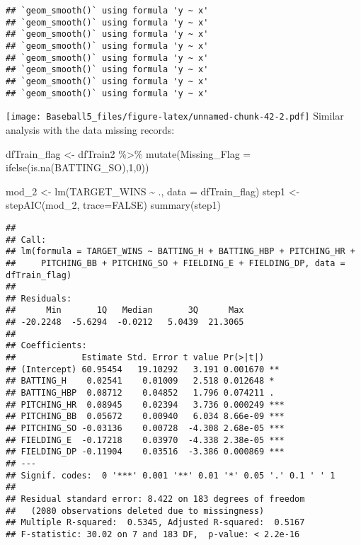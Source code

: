 \documentclass[
]{article}
\newenvironment{Shaded}{\begin{snugshade}}{\end{snugshade}}
\newcommand{\AttributeTok}[1]{\textcolor[rgb]{0.77,0.63,0.00}{#1}}
\newcommand{\ConstantTok}[1]{\textcolor[rgb]{0.00,0.00,0.00}{#1}}
\newcommand{\DecValTok}[1]{\textcolor[rgb]{0.00,0.00,0.81}{#1}}
\newcommand{\FunctionTok}[1]{\textcolor[rgb]{0.00,0.00,0.00}{#1}}
\newcommand{\NormalTok}[1]{#1}
\newcommand{\OtherTok}[1]{\textcolor[rgb]{0.56,0.35,0.01}{#1}}
\newcommand{\SpecialCharTok}[1]{\textcolor[rgb]{0.00,0.00,0.00}{#1}}
\begin{document}
\begin{verbatim}
## `geom_smooth()` using formula 'y ~ x'
## `geom_smooth()` using formula 'y ~ x'
## `geom_smooth()` using formula 'y ~ x'
## `geom_smooth()` using formula 'y ~ x'
## `geom_smooth()` using formula 'y ~ x'
## `geom_smooth()` using formula 'y ~ x'
## `geom_smooth()` using formula 'y ~ x'
## `geom_smooth()` using formula 'y ~ x'
\end{verbatim}

\texttt{[image: Baseball5\_files/figure-latex/unnamed-chunk-42-2.pdf]}
Similar analysis with the data missing records:

\begin{Shaded}
\begin{Highlighting}[]
\NormalTok{dfTrain\_flag }\OtherTok{\textless{}{-}}\NormalTok{ dfTrain2 }\SpecialCharTok{\%\textgreater{}\%}
  \FunctionTok{mutate}\NormalTok{(}\AttributeTok{Missing\_Flag =} \FunctionTok{ifelse}\NormalTok{(}\FunctionTok{is.na}\NormalTok{(BATTING\_SO),}\DecValTok{1}\NormalTok{,}\DecValTok{0}\NormalTok{))}

\NormalTok{mod\_2 }\OtherTok{\textless{}{-}} \FunctionTok{lm}\NormalTok{(TARGET\_WINS }\SpecialCharTok{\textasciitilde{}}\NormalTok{ ., }\AttributeTok{data =}\NormalTok{ dfTrain\_flag)}
\NormalTok{step1 }\OtherTok{\textless{}{-}} \FunctionTok{stepAIC}\NormalTok{(mod\_2, }\AttributeTok{trace=}\ConstantTok{FALSE}\NormalTok{)}
\FunctionTok{summary}\NormalTok{(step1)}
\end{Highlighting}
\end{Shaded}

\begin{verbatim}
## 
## Call:
## lm(formula = TARGET_WINS ~ BATTING_H + BATTING_HBP + PITCHING_HR + 
##     PITCHING_BB + PITCHING_SO + FIELDING_E + FIELDING_DP, data = dfTrain_flag)
## 
## Residuals:
##      Min       1Q   Median       3Q      Max 
## -20.2248  -5.6294  -0.0212   5.0439  21.3065 
## 
## Coefficients:
##             Estimate Std. Error t value Pr(>|t|)    
## (Intercept) 60.95454   19.10292   3.191 0.001670 ** 
## BATTING_H    0.02541    0.01009   2.518 0.012648 *  
## BATTING_HBP  0.08712    0.04852   1.796 0.074211 .  
## PITCHING_HR  0.08945    0.02394   3.736 0.000249 ***
## PITCHING_BB  0.05672    0.00940   6.034 8.66e-09 ***
## PITCHING_SO -0.03136    0.00728  -4.308 2.68e-05 ***
## FIELDING_E  -0.17218    0.03970  -4.338 2.38e-05 ***
## FIELDING_DP -0.11904    0.03516  -3.386 0.000869 ***
## ---
## Signif. codes:  0 '***' 0.001 '**' 0.01 '*' 0.05 '.' 0.1 ' ' 1
## 
## Residual standard error: 8.422 on 183 degrees of freedom
##   (2080 observations deleted due to missingness)
## Multiple R-squared:  0.5345, Adjusted R-squared:  0.5167 
## F-statistic: 30.02 on 7 and 183 DF,  p-value: < 2.2e-16
\end{verbatim}
\end{document}
